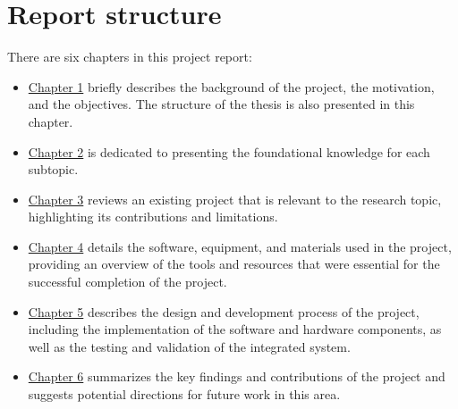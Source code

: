 \section{Report structure}

There are six chapters in this project report:

\begin{itemize}
    \item \hyperref[chapter:introduction]{Chapter 1} briefly describes the background of the project, the motivation, and the objectives. The structure of the thesis is also presented in this chapter.
    \item \hyperref[chapter:theoretical-background]{Chapter 2} is dedicated to presenting the foundational knowledge for each subtopic.
    \item \hyperref[chapter:related-work]{Chapter 3} reviews an existing project that is relevant to the research topic, highlighting its contributions and limitations.
    \item \hyperref[chapter:components]{Chapter 4} details the software, equipment, and materials used in the project, providing an overview of the tools and resources that were essential for the successful completion of the project.
    \item \hyperref[chapter:development]{Chapter 5} describes the design and development process of the project, including the implementation of the software and hardware components, as well as the testing and validation of the integrated system.
    \item \hyperref[chapter:conclusion]{Chapter 6} summarizes the key findings and contributions of the project and suggests potential directions for future work in this area.
\end{itemize}
